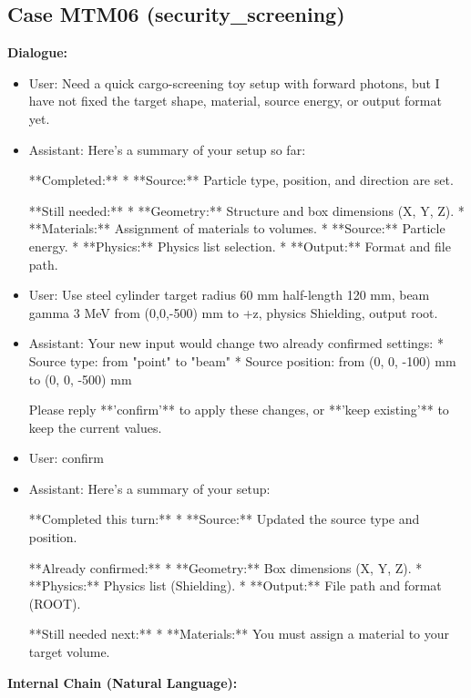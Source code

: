 \documentclass[11pt]{ctexart}
\begin{document}
\subsection{Case MTM06 (security\_screening)}
\textbf{Dialogue:}
\begin{itemize}
\item User: Need a quick cargo-screening toy setup with forward photons, but I have not fixed the target shape, material, source energy, or output format yet.
\item Assistant: Here's a summary of your setup so far:

**Completed:**
*   **Source:** Particle type, position, and direction are set.

**Still needed:**
*   **Geometry:** Structure and box dimensions (X, Y, Z).
*   **Materials:** Assignment of materials to volumes.
*   **Source:** Particle energy.
*   **Physics:** Physics list selection.
*   **Output:** Format and file path.
\item User: Use steel cylinder target radius 60 mm half-length 120 mm, beam gamma 3 MeV from (0,0,-500) mm to +z, physics Shielding, output root.
\item Assistant: Your new input would change two already confirmed settings:
*   Source type: from "point" to "beam"
*   Source position: from (0, 0, -100) mm to (0, 0, -500) mm

Please reply **'confirm'** to apply these changes, or **'keep existing'** to keep the current values.
\item User: confirm
\item Assistant: Here's a summary of your setup:

**Completed this turn:**
*   **Source:** Updated the source type and position.

**Already confirmed:**
*   **Geometry:** Box dimensions (X, Y, Z).
*   **Physics:** Physics list (Shielding).
*   **Output:** File path and format (ROOT).

**Still needed next:**
*   **Materials:** You must assign a material to your target volume.
\end{itemize}
\textbf{Internal Chain (Natural Language):}
\end{document}
